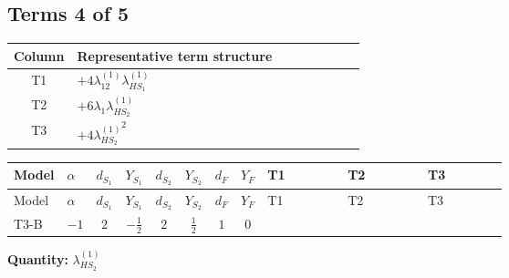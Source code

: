 \documentclass[8pt]{article}
\begin{document}
\begin{landscape}
\subsection*{Terms 4 of 5}
\begin{center}
\begin{tabular}{@{}c >{\raggedright\arraybackslash}p{0.82\linewidth}@{}}
\toprule
Column & Representative term structure \\
\midrule
T1 & \(\displaystyle +4 {\lambda_{12}^{(1)}} {\lambda_{HS_1}^{(1)}}\) \\
\midrule
T2 & \(\displaystyle +6 {\lambda_1} {\lambda_{HS_2}^{(1)}}\) \\
\midrule
T3 & \(\displaystyle +4 {\lambda_{HS_2}^{(1)}}^2\) \\
\midrule
\bottomrule
\end{tabular}
\end{center}
\smallskip
\tiny
\begin{longtable}{@{}llcccccc >{\raggedright\arraybackslash}p{0.21\linewidth} >{\raggedright\arraybackslash}p{0.21\linewidth} >{\raggedright\arraybackslash}p{0.21\linewidth}@{}}
\toprule
Model & $\alpha$ & $d_{S_1}$ & $Y_{S_1}$ & $d_{S_2}$ & $Y_{S_2}$ & $d_F$ & $Y_F$ & T1 & T2 & T3 \\
\midrule
\endfirsthead
\toprule
Model & $\alpha$ & $d_{S_1}$ & $Y_{S_1}$ & $d_{S_2}$ & $Y_{S_2}$ & $d_F$ & $Y_F$ & T1 & T2 & T3 \\
\midrule
\endhead
T3-B & $-1$ & $2$ & $-\frac{1}{2}$ & $2$ & $\frac{1}{2}$ & $1$ & $0$ & \scriptsize\adjustbox{max width=\linewidth}{$\begin{gathered} +4 {\lambda_{12}^{(1)}} {\lambda_{HS_1}^{(1)}}\end{gathered}$} & \scriptsize\adjustbox{max width=\linewidth}{$\begin{gathered} +6 {\lambda_1} {\lambda_{HS_2}^{(1)}}\end{gathered}$} & \scriptsize\adjustbox{max width=\linewidth}{$\begin{gathered} +4 {\lambda_{HS_2}^{(1)}}^2\end{gathered}$} \\
\midrule
\bottomrule
\end{longtable}
\clearpage
\noindent\textbf{Quantity: }$\lambda_{HS_2}^{(1)}$\par\smallskip

\end{landscape}
\end{document}

